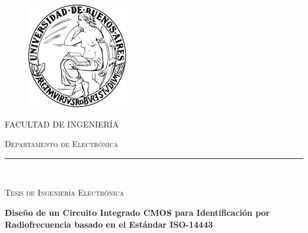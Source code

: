 \begin{titlepage}

\begin{center}
	\begin{figure}[htb]
		\begin{center}
			\includegraphics[width=0.4\linewidth]{UBA}
		\end{center}
	\end{figure}

	\begin{Large}
		\textsc{FACULTAD DE INGENIERÍA}\\
	\end{Large}
	
	\vspace*{0.15in}
	
	\begin{large}
		\textsc{Departamento de Electrónica} \\
	\end{large}
	
	\vspace*{0.3in}
	
	\rule{\textwidth}{0.1em}\\
	
	\vspace*{0.15in}
	
	\begin{large}
		\textsc{Tesis de Ingeniería Electrónica}\\
	\end{large}
	
	\vspace*{0.2in}
	
	\begin{huge}
		\textbf{Diseño de un Circuito Integrado CMOS para Identificación por Radiofrecuencia basado en el Estándar ISO-14443} \\
	\end{huge}
	
	\vspace*{0.15in}
	

\end{center}
\end{titlepage}
